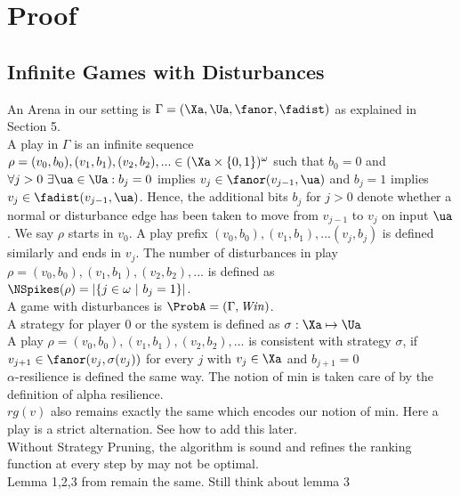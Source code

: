 \clearpage

\section{Proof}

\subsection{Infinite Games with Disturbances}

An Arena in our setting is $\Gamma=(\Xa,\Ua,\fanor,\fadist)$ as explained in Section 5. \\
 A play in $\Gamma$ is an infinite sequence $\rho = (v_{0}, b_{0}), (v_{1}, b_{1}), (v_{2}, b_{2}), ... \in (\Xa \times \{0,1\})^{\omega}$ such that $ b_{0} = 0$ and $\forall j>0  \ \exists \ua \in \Ua: b_{j} = 0$ implies $v_{j} \in \fanor(v_{j-1}, \ua)$ and $b_{j} = 1$ implies $v_{j} \in \fadist(v_{j-1}, \ua)$. Hence, the additional bits $b_{j}$ for $j>0$ denote whether a normal or disturbance edge has been taken to move from $v_{j-1}$ to $v_{j}$ on input $\ua$. We say $\rho$ starts in $v_{0}$. A play prefix $(v_{0}, b_{0}), (v_{1}, b_{1}), ... (v_{j}, b_{j})$  is defined similarly and ends in $v_{j}$. The number of disturbances in play $\rho = (v_{0}, b_{0}), (v_{1}, b_{1}), (v_{2}, b_{2}), ... $ is defined as $\NSpikes(\rho) = | \{j \in \omega \ |\ b_{j} = 1 \}|$.\\
A game with disturbances is $\ProbA=(\Gamma,\mathit{Win})$. \\
A strategy for player 0 or the system is defined as $\sigma: \Xa \mapsto \Ua$ \\
A play $\rho = (v_{0}, b_{0}), (v_{1}, b_{1}), (v_{2}, b_{2}), ...$ is consistent with strategy $\sigma$, if $v_{j+1} \in \fanor(v_{j}, \sigma(v_{j}))$ for every $j$ with $v_{j} \in \Xa$ and $b_{j+1}= 0$\\

$\alpha$-resilience is defined the same way. The notion of min is taken care of by the definition of alpha resilience. \\
$rg(v)$ also remains exactly the same which encodes our notion of min.
Here a play is a strict alternation. See how to add this later. \\

Without Strategy Pruning, the algorithm is sound and refines the ranking function at every step by may not be optimal. \\

Lemma 1,2,3 from \cite{DBLP:conf/csl/NeiderW018} remain the same. Still think about lemma 3

